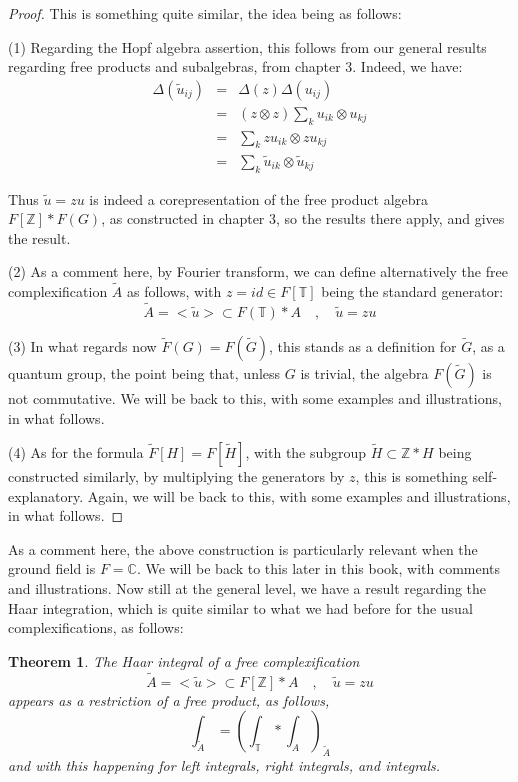\documentclass[12pt]{amsbook}
\newtheorem{theorem}{Theorem}[chapter]
\begin{document}
\begin{proof}
This is something quite similar, the idea being as follows:

\medskip

(1) Regarding the Hopf algebra assertion, this follows from our general results regarding free products and subalgebras, from chapter 3. Indeed, we have:
\begin{eqnarray*}
\Delta(\tilde{u}_{ij})
&=&\Delta(z)\Delta(u_{ij})\\
&=&(z\otimes z)\sum_ku_{ik}\otimes u_{kj}\\
&=&\sum_k zu_{ik}\otimes zu_{kj}\\
&=&\sum_k\tilde{u}_{ik}\otimes\tilde{u}_{kj}
\end{eqnarray*}

Thus $\tilde{u}=zu$ is indeed a corepresentation of the free product algebra $F[\mathbb Z]*F(G)$, as constructed in chapter 3, so the results there apply, and gives the result.

\medskip

(2) As a comment here, by Fourier transform, we can define alternatively the free complexification $\widetilde{A}$ as follows, with $z=id\in F[\mathbb T]$ being the standard generator:
$$\widetilde{A}=<\tilde{u}>\subset F(\mathbb T)*A\quad,\quad\tilde{u}=zu$$

(3) In what regards now $\widetilde{F}(G)=F(\widetilde{G})$, this stands as a definition for $\widetilde{G}$, as a quantum group, the point being that, unless $G$ is trivial, the algebra $F(\widetilde{G})$ is not commutative. We will be back to this, with some examples and illustrations, in what follows.

\medskip

(4) As for the formula $\widetilde{F}[H]=F[\widetilde{H}]$, with the subgroup $\widetilde{H}\subset\mathbb Z*H$ being constructed similarly, by multiplying the generators by $z$, this is something self-explanatory. Again, we will be back to this, with some examples and illustrations, in what follows.
\end{proof}

As a comment here, the above construction is particularly relevant when the ground field is $F=\mathbb C$. We will be back to this later in this book, with comments and illustrations. Now still at the general level, we have a result regarding the Haar integration, which is quite similar to what we had before for the usual complexifications, as follows:

\begin{theorem}
The Haar integral of a free complexification
$$\widetilde{A}=<\tilde{u}>\subset F[\mathbb Z]*A\quad,\quad\tilde{u}=zu$$
appears as a restriction of a free product, as follows,
$$\int_{\widetilde{A}}=\left(\int_\mathbb T*\int_A\right)_{\widetilde{A}}$$
and with this happening for left integrals, right integrals, and integrals.
\end{theorem}
\end{document}
